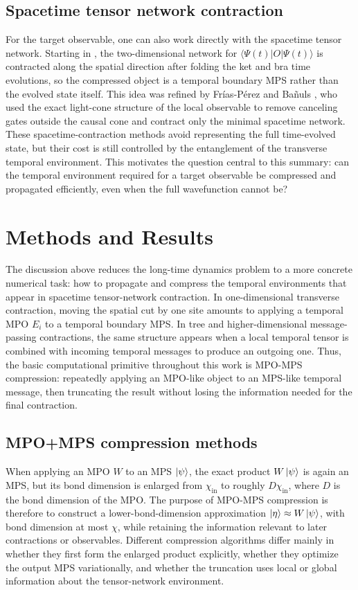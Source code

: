 \documentclass[12pt]{article}
\begin{document}
\subsection{Spacetime tensor network contraction}
For the target observable, one can also work directly with the spacetime tensor network. 
Starting in \cite{banulsMatrixProductStates2009b}, the two-dimensional network for \(\langle \Psi(t)|O|\Psi(t)\rangle\) is contracted along the spatial direction after folding the ket and bra time evolutions, so the compressed object is a temporal boundary MPS rather than the evolved state itself. 
This idea was refined by Frías-Pérez and Bañuls \cite{frias-perezLightConeTensor2022}, who used the exact light-cone structure of the local observable to remove canceling gates outside the causal cone and contract only the minimal spacetime network. 
These spacetime-contraction methods avoid representing the full time-evolved state, but their cost is still controlled by the entanglement of the transverse temporal environment. 
This motivates the question central to this summary: can the temporal environment required for a target observable be compressed and propagated efficiently, even when the full wavefunction cannot be?

\section{Methods and Results}

The discussion above reduces the long-time dynamics problem to a more concrete numerical task: how to propagate and compress the temporal environments that appear in spacetime tensor-network contraction.
In one-dimensional transverse contraction, moving the spatial cut by one site amounts to applying a temporal MPO \(E_i\) to a temporal boundary MPS.
In tree and higher-dimensional message-passing contractions, the same structure appears when a local temporal tensor is combined with incoming temporal messages to produce an outgoing one.
Thus, the basic computational primitive throughout this work is MPO-MPS compression: repeatedly applying an MPO-like object to an MPS-like temporal message, then truncating the result without losing the information needed for the final contraction.

\subsection{MPO+MPS compression methods}

When applying an MPO \(W\) to an MPS \(\ket{\psi}\), the exact product \(W\ket{\psi}\) is again an MPS, but its bond dimension is enlarged from \(\chi_{\mathrm{in}}\) to roughly \(D\chi_{\mathrm{in}}\), where \(D\) is the bond dimension of the MPO.
The purpose of MPO-MPS compression is therefore to construct a lower-bond-dimension approximation \(\ket{\eta}\approx W\ket{\psi}\), with bond dimension at most \(\chi\), while retaining the information relevant to later contractions or observables. 
Different compression algorithms differ mainly in whether they first form the enlarged product explicitly, whether they optimize the output MPS variationally, and whether the truncation uses local or global information about the tensor-network environment.
\end{document}
